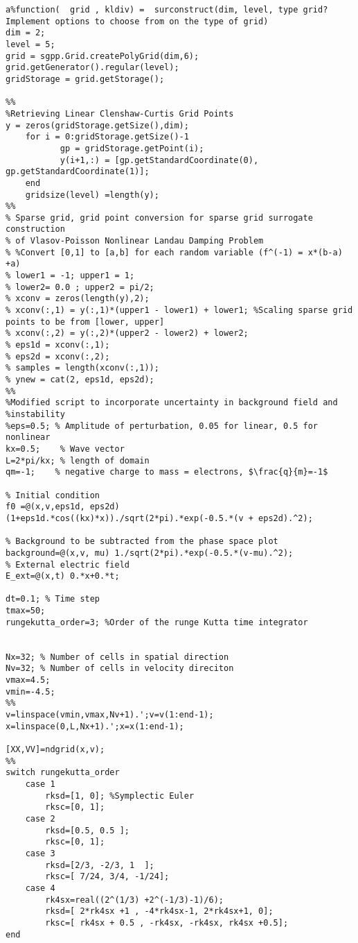 \documentclass{article}
\begin{document}
\begin{lstlisting}
a%function(  grid , kldiv) =  surconstruct(dim, level, type grid? Implement options to choose from on the type of grid)
dim = 2;
level = 5;
grid = sgpp.Grid.createPolyGrid(dim,6);
grid.getGenerator().regular(level);
gridStorage = grid.getStorage();

%%
%Retrieving Linear Clenshaw-Curtis Grid Points
y = zeros(gridStorage.getSize(),dim);
    for i = 0:gridStorage.getSize()-1
           gp = gridStorage.getPoint(i);
           y(i+1,:) = [gp.getStandardCoordinate(0), gp.getStandardCoordinate(1)];
    end
    gridsize(level) =length(y);
%%
% Sparse grid, grid point conversion for sparse grid surrogate construction
% of Vlasov-Poisson Nonlinear Landau Damping Problem 
% %Convert [0,1] to [a,b] for each random variable (f^(-1) = x*(b-a) +a)
% lower1 = -1; upper1 = 1;
% lower2= 0.0 ; upper2 = pi/2;
% xconv = zeros(length(y),2);
% xconv(:,1) = y(:,1)*(upper1 - lower1) + lower1; %Scaling sparse grid points to be from [lower, upper]
% xconv(:,2) = y(:,2)*(upper2 - lower2) + lower2;
% eps1d = xconv(:,1);
% eps2d = xconv(:,2);
% samples = length(xconv(:,1));
% ynew = cat(2, eps1d, eps2d);
%%
%Modified script to incorporate uncertainty in background field and
%instability
%eps=0.5; % Amplitude of perturbation, 0.05 for linear, 0.5 for nonlinear
kx=0.5;    % Wave vector
L=2*pi/kx; % length of domain
qm=-1;    % negative charge to mass = electrons, $\frac{q}{m}=-1$

% Initial condition
f0 =@(x,v,eps1d, eps2d)   (1+eps1d.*cos((kx)*x))./sqrt(2*pi).*exp(-0.5.*(v + eps2d).^2);
 
% Background to be subtracted from the phase space plot
background=@(x,v, mu) 1./sqrt(2*pi).*exp(-0.5.*(v-mu).^2);
% External electric field
E_ext=@(x,t) 0.*x+0.*t;

dt=0.1; % Time step
tmax=50;
rungekutta_order=3; %Order of the runge Kutta time integrator


Nx=32; % Number of cells in spatial direction
Nv=32; % Number of cells in velocity direciton
vmax=4.5;
vmin=-4.5;
%%
v=linspace(vmin,vmax,Nv+1).';v=v(1:end-1);
x=linspace(0,L,Nx+1).';x=x(1:end-1);

[XX,VV]=ndgrid(x,v); 
%%
switch rungekutta_order
    case 1
        rksd=[1, 0]; %Symplectic Euler
        rksc=[0, 1];
    case 2
        rksd=[0.5, 0.5 ];
        rksc=[0, 1];
    case 3
        rksd=[2/3, -2/3, 1  ];
        rksc=[ 7/24, 3/4, -1/24];
    case 4
        rk4sx=real((2^(1/3) +2^(-1/3)-1)/6);
        rksd=[ 2*rk4sx +1 , -4*rk4sx-1, 2*rk4sx+1, 0];
        rksc=[ rk4sx + 0.5 , -rk4sx, -rk4sx, rk4sx +0.5];
end


\end{lstlisting}
\end{document}
